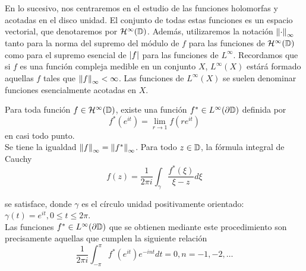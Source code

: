 En lo sucesivo, nos centraremos en el estudio de las funciones holomorfas y acotadas en el disco unidad. El conjunto de todas estas funciones es un espacio vectorial, que denotaremos por $\mathcal{H}^{\infty}(\mathbb{D})$. Además, utilizaremos la notación $\left\lVert\cdot\right\rVert_{\infty}$ tanto para la norma del supremo del módulo de $f$ para las funciones de $\mathcal{H}^{\infty}(\mathbb{D})$ como para el supremo esencial de $\left\lvert f\right\rvert$ para las funciones de $L^\infty$. Recordamos que si $f$ es una función compleja medible en un conjunto $X$, $L^\infty(X)$ estárá formado aquellas $f$ tales que $\left\lVert f\right\rVert_{\infty} < \infty$. Las funciones de  $L^\infty(X)$ se suelen denominar funciones esencialmente acotadas en $X$. \\

\begin{theorem}
    Para toda función $f \in \mathcal{H}^{\infty}(\mathbb{D})$, existe una función $f^* \in L^{\infty} (\partial \mathbb{D})$ definida por
    \begin{equation}
        \label{eq:fatou1}
        f^*(e^{it}) = \lim_{r \to 1} f(re^{it})
    \end{equation}
    en casi todo punto. \\

    Se tiene la igualdad $\left\lVert f\right\rVert_{\infty} = \left\lVert f^*\right\rVert_{\infty}$. Para todo $z \in \mathbb{D}$, la fórmula integral de Cauchy
    \begin{equation}
        \label{eq:fatou2}
        f(z) = \dfrac{1}{2 \pi i} \int_{\gamma} \dfrac{f^*(\xi)}{\xi - z} d\xi
    \end{equation}

    se satisface, donde $\gamma$ es el círculo unidad positivamente orientado: $\gamma(t) = e^{it}, 0 \leq t \leq 2 \pi$. \\

    Las funciones $f^* \in L^{\infty}(\partial \mathbb{D})$ que se obtienen mediante este procedimiento son precisamente aquellas que cumplen la siguiente relación
    \begin{equation}
        \label{eq:fatou3}
        \dfrac{1}{2 \pi i} \int_{-\pi}^{\pi} f^*(e^{it})e^{-int} dt = 0, n = -1,-2, \dots
    \end{equation}
\end{theorem}

